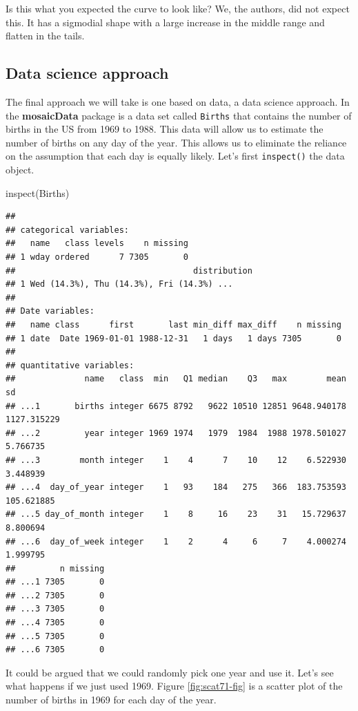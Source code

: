 \documentclass[
]{book}
\newenvironment{Shaded}{\begin{snugshade}}{\end{snugshade}}
\newcommand{\FunctionTok}[1]{\textcolor[rgb]{0.00,0.00,0.00}{#1}}
\newcommand{\NormalTok}[1]{#1}
\begin{document}
Is this what you expected the curve to look like? We, the authors, did not expect this. It has a sigmodial shape with a large increase in the middle range and flatten in the tails.

\hypertarget{data-science-approach}{%
\subsection{Data science approach}\label{data-science-approach}}

The final approach we will take is one based on data, a data science approach. In the \textbf{mosaicData} package is a data set called \texttt{Births} that contains the number of births in the US from 1969 to 1988. This data will allow us to estimate the number of births on any day of the year. This allows us to eliminate the reliance on the assumption that each day is equally likely. Let's first \texttt{inspect()} the data object.

\begin{Shaded}
\begin{Highlighting}[]
\FunctionTok{inspect}\NormalTok{(Births)}
\end{Highlighting}
\end{Shaded}

\begin{verbatim}
## 
## categorical variables:  
##   name   class levels    n missing
## 1 wday ordered      7 7305       0
##                                    distribution
## 1 Wed (14.3%), Thu (14.3%), Fri (14.3%) ...    
## 
## Date variables:  
##   name class      first       last min_diff max_diff    n missing
## 1 date  Date 1969-01-01 1988-12-31   1 days   1 days 7305       0
## 
## quantitative variables:  
##              name   class  min   Q1 median    Q3   max        mean          sd
## ...1       births integer 6675 8792   9622 10510 12851 9648.940178 1127.315229
## ...2         year integer 1969 1974   1979  1984  1988 1978.501027    5.766735
## ...3        month integer    1    4      7    10    12    6.522930    3.448939
## ...4  day_of_year integer    1   93    184   275   366  183.753593  105.621885
## ...5 day_of_month integer    1    8     16    23    31   15.729637    8.800694
## ...6  day_of_week integer    1    2      4     6     7    4.000274    1.999795
##         n missing
## ...1 7305       0
## ...2 7305       0
## ...3 7305       0
## ...4 7305       0
## ...5 7305       0
## ...6 7305       0
\end{verbatim}

It could be argued that we could randomly pick one year and use it. Let's see what happens if we just used 1969. Figure \ref{fig:scat71-fig} is a scatter plot of the number of births in 1969 for each day of the year.
\end{document}
